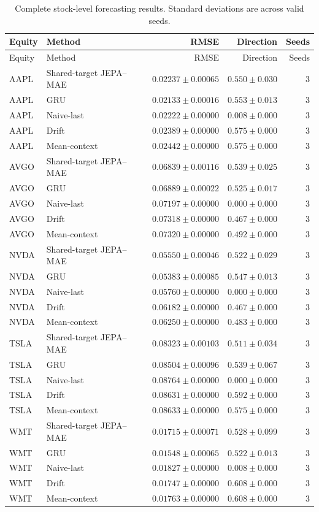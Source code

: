 \begin{longtable}{llrrr}
\caption{Complete stock-level forecasting results. Standard deviations are across valid seeds.}\label{tab:appendix_stock_metrics}\\
\toprule
Equity & Method & RMSE & Direction & Seeds \\
\midrule
\endfirsthead
\toprule
Equity & Method & RMSE & Direction & Seeds \\
\midrule
\endhead
AAPL & Shared-target JEPA--MAE & $0.02237 \pm 0.00065$ & $0.550 \pm 0.030$ & 3 \\
AAPL & GRU & $0.02133 \pm 0.00016$ & $0.553 \pm 0.013$ & 3 \\
AAPL & Naive-last & $0.02222 \pm 0.00000$ & $0.008 \pm 0.000$ & 3 \\
AAPL & Drift & $0.02389 \pm 0.00000$ & $0.575 \pm 0.000$ & 3 \\
AAPL & Mean-context & $0.02442 \pm 0.00000$ & $0.575 \pm 0.000$ & 3 \\
AVGO & Shared-target JEPA--MAE & $0.06839 \pm 0.00116$ & $0.539 \pm 0.025$ & 3 \\
AVGO & GRU & $0.06889 \pm 0.00022$ & $0.525 \pm 0.017$ & 3 \\
AVGO & Naive-last & $0.07197 \pm 0.00000$ & $0.000 \pm 0.000$ & 3 \\
AVGO & Drift & $0.07318 \pm 0.00000$ & $0.467 \pm 0.000$ & 3 \\
AVGO & Mean-context & $0.07320 \pm 0.00000$ & $0.492 \pm 0.000$ & 3 \\
NVDA & Shared-target JEPA--MAE & $0.05550 \pm 0.00046$ & $0.522 \pm 0.029$ & 3 \\
NVDA & GRU & $0.05383 \pm 0.00085$ & $0.547 \pm 0.013$ & 3 \\
NVDA & Naive-last & $0.05760 \pm 0.00000$ & $0.000 \pm 0.000$ & 3 \\
NVDA & Drift & $0.06182 \pm 0.00000$ & $0.467 \pm 0.000$ & 3 \\
NVDA & Mean-context & $0.06250 \pm 0.00000$ & $0.483 \pm 0.000$ & 3 \\
TSLA & Shared-target JEPA--MAE & $0.08323 \pm 0.00103$ & $0.511 \pm 0.034$ & 3 \\
TSLA & GRU & $0.08504 \pm 0.00096$ & $0.539 \pm 0.067$ & 3 \\
TSLA & Naive-last & $0.08764 \pm 0.00000$ & $0.000 \pm 0.000$ & 3 \\
TSLA & Drift & $0.08631 \pm 0.00000$ & $0.592 \pm 0.000$ & 3 \\
TSLA & Mean-context & $0.08633 \pm 0.00000$ & $0.575 \pm 0.000$ & 3 \\
WMT & Shared-target JEPA--MAE & $0.01715 \pm 0.00071$ & $0.528 \pm 0.099$ & 3 \\
WMT & GRU & $0.01548 \pm 0.00065$ & $0.522 \pm 0.013$ & 3 \\
WMT & Naive-last & $0.01827 \pm 0.00000$ & $0.008 \pm 0.000$ & 3 \\
WMT & Drift & $0.01747 \pm 0.00000$ & $0.608 \pm 0.000$ & 3 \\
WMT & Mean-context & $0.01763 \pm 0.00000$ & $0.608 \pm 0.000$ & 3 \\
\bottomrule
\end{longtable}
